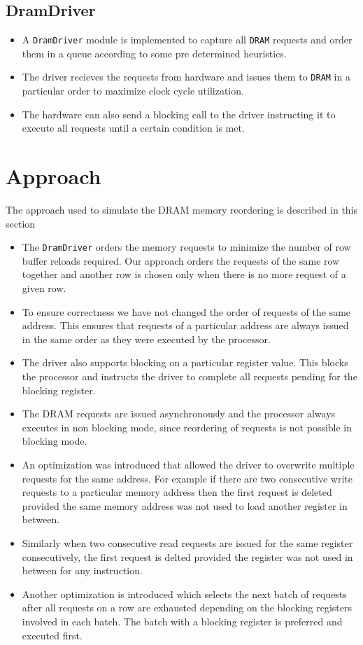 \documentclass[hidelinks,12pt]{article}
\begin{document}
\subsection{DramDriver}
\begin{itemize}
    \item A \verb|DramDriver| module is implemented to capture all \verb|DRAM| requests and order them in a queue according to some pre determined heuristics.
    \item The driver recieves the requests from hardware and issues them to \verb|DRAM| in a particular order to maximize clock cycle utilization.
    \item The hardware can also send a blocking call to the driver instructing it to execute all requests until a certain condition is met.
\end{itemize}

\section{Approach}

The approach used to simulate the DRAM memory reordering is described in this section
\begin{itemize}
    \item The \verb|DramDriver| orders the memory requests to minimize the number of row buffer reloads required. Our approach orders the requests of the same row together and another row is chosen only when there is no more request of a given row.
    \item To ensure correctness we have not changed the order of requests of the same address. This ensures that requests of a particular address are always issued in the same order as they were executed by the processor.
    \item The driver also supports blocking on a particular register value. This blocks the processor and instructs the driver to complete all requests pending for the blocking register.
    \item The DRAM requests are issued asynchronously and the processor always executes in non blocking mode, since reordering of requests is not possible in blocking mode.
    \item An optimization was introduced that allowed the driver to overwrite multiple requests for the same address. For example if there are two consecutive write requests to a particular memory address then the first request is deleted provided the same memory address was not used to load another register in between.
    \item Similarly when two consecutive read requests are issued for the same register consecutively, the first request is delted provided the register was not used in between for any instruction.
    \item Another optimization is introduced which selects the next batch of requests after all requests on a row are exhausted depending on the blocking registers involved in each batch. The batch with a blocking register is preferred and executed first.
\end{itemize}
\end{document}
